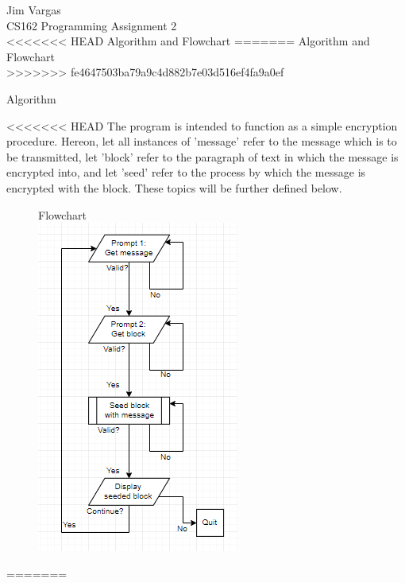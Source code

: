 \documentclass[12]{article}
\begin{document}
\linespread{1.25}
\noindent
Jim Vargas\\
CS162 Programming Assignment 2\\
<<<<<<< HEAD
Algorithm and Flowchart
=======
Algorithm and Flowchart\\
>>>>>>> fe4647503ba79a9c4d882b7e03d516ef4fa9a0ef
\begin{center}
Algorithm
\end{center}

<<<<<<< HEAD
	The program is intended to function as a simple encryption procedure. Hereon, let all instances of 'message' refer to the message which is to be transmitted, let 'block' refer to the paragraph of text in which the message is encrypted into, and let 'seed' refer to the process by which the message is encrypted with the block. These topics will be further defined below.
	

\begin{figure}
Flowchart\\
\centering
\includegraphics[scale=1]{flowchart.PNG}\\
\end{figure}

=======
\end{document}
